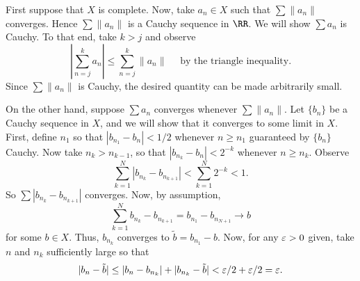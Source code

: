 \documentclass{homework}
\begin{document}
\begin{solution}
First suppose that $X$ is complete. Now, take $a_n\in X$ such that $\sum \|a_n\|$ converges. Hence $\sum\|a_n\|$ is a Cauchy sequence in $\RR$. We will show $\sum a_n$ is Cauchy. To that end, take $k>j$ and observe
$$
  \left|\sum_{n=j}^k a_n\right| \le \sum_{n=j}^k \|a_n\|\quad\text{ by the triangle inequality}.
$$
Since $\sum\|a_n\|$ is Cauchy, the desired quantity can be made arbitrarily small.

On the other hand, suppose $\sum a_n$ converges whenever $\sum \|a_n\|$. Let $\{b_n\}$ be a Cauchy sequence in $X$, and we will show that it converges to some limit in $X$.  First, define $n_1$ so that $|b_{n_1} - b_n| < 1/2$ whenever $n\ge n_1$ guaranteed by $\{b_n\}$ Cauchy. Now take $n_k> n_{k-1}$, so that $|b_{n_k} - b_n| < 2^{-k}$ whenever $n\ge {n_k}$. Observe
$$
  \sum_{k=1}^N|b_{n_k} - b_{n_{k+1}}| < \sum_{k=1}^N 2^{-k} < 1.
$$
So $\sum|b_{n_k} - b_{n_{k+1}}|$ converges. Now, by assumption,
$$
  \sum_{k=1}^N b_{n_k} - b_{n_{k+1}} = b_{n_1} - b_{n_{N+1}} \to b
$$
for some $b\in X$. Thus, $b_{n_k}$ converges to $\tilde b = b_{n_1} - b$.  Now, for any $\varepsilon > 0$ given, take $n$ and $n_k$ sufficiently large so that
$$
  |b_n - \tilde b| \le |b_n - b_{n_k}| + |b_{n_k} - \tilde b| < \varepsilon/2 + \varepsilon/2 = \varepsilon.
$$
\end{solution}
\newpage
{}
\end{document}
